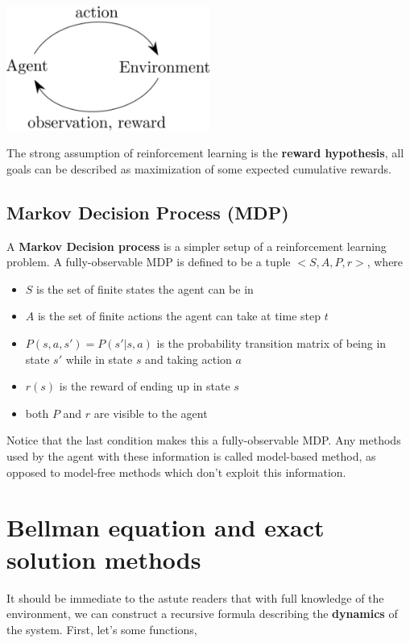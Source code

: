 \documentclass[graybox]{svmult}
\begin{document}
\begin{center}
\includegraphics[width=0.5\textwidth]{learning.png}
\end{center}

The strong assumption of reinforcement learning is the \textbf{reward hypothesis}, all goals can be described as maximization of some expected cumulative rewards.  

\subsection{Markov Decision Process (MDP)}
A \textbf{Markov Decision process} is a simpler setup of a reinforcement learning problem. A fully-observable MDP is defined to be a tuple $<S, A, P, r>$, where
\begin{itemize}
\item $S$ is the set of finite states the agent can be in
\item $A$ is the set of finite actions the agent can take at time step $t$
\item $P(s, a, s') = P(s' | s,  a)$ is the probability transition matrix of being in state $s'$ while in state $s$ and taking action $a$
\item $r(s)$ is the reward of ending up in state $s$ 
\item both $P$ and $r$ are visible to the agent
\end{itemize}

Notice that the last condition makes this a fully-observable MDP. Any methods used by the agent with these information is called model-based method, as opposed to model-free methods which don't exploit this information.

\section{Bellman equation and exact solution methods}

It should be immediate to the astute readers that with full knowledge of the environment, we can construct a recursive formula describing the \textbf{dynamics} of the system. First, let's some functions,
\end{document}
